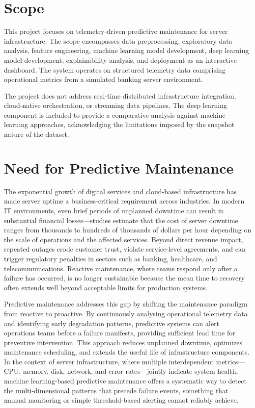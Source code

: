 \documentclass[12pt,letterpaper]{report}
\begin{document}
\section{Scope}

This project focuses on telemetry-driven predictive maintenance for server infrastructure. The scope encompasses data preprocessing, exploratory data analysis, feature engineering, machine learning model development, deep learning model development, explainability analysis, and deployment as an interactive dashboard. The system operates on structured telemetry data comprising operational metrics from a simulated banking server environment.

The project does not address real-time distributed infrastructure integration, cloud-native orchestration, or streaming data pipelines. The deep learning component is included to provide a comparative analysis against machine learning approaches, acknowledging the limitations imposed by the snapshot nature of the dataset.

\section{Need for Predictive Maintenance}

The exponential growth of digital services and cloud-based infrastructure has made server uptime a business-critical requirement across industries. In modern IT environments, even brief periods of unplanned downtime can result in substantial financial losses---studies estimate that the cost of server downtime ranges from thousands to hundreds of thousands of dollars per hour depending on the scale of operations and the affected services. Beyond direct revenue impact, repeated outages erode customer trust, violate service-level agreements, and can trigger regulatory penalties in sectors such as banking, healthcare, and telecommunications. Reactive maintenance, where teams respond only after a failure has occurred, is no longer sustainable because the mean time to recovery often extends well beyond acceptable limits for production systems.

Predictive maintenance addresses this gap by shifting the maintenance paradigm from reactive to proactive. By continuously analysing operational telemetry data and identifying early degradation patterns, predictive systems can alert operations teams before a failure manifests, providing sufficient lead time for preventive intervention. This approach reduces unplanned downtime, optimizes maintenance scheduling, and extends the useful life of infrastructure components. In the context of server infrastructure, where multiple interdependent metrics---CPU, memory, disk, network, and error rates---jointly indicate system health, machine learning-based predictive maintenance offers a systematic way to detect the multi-dimensional patterns that precede failure events, something that manual monitoring or simple threshold-based alerting cannot reliably achieve.
\end{document}
